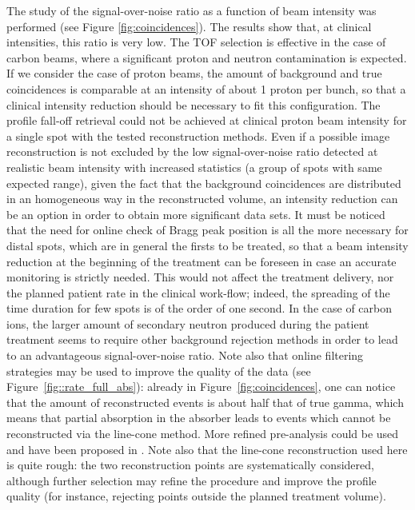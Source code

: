 The study of the signal-over-noise ratio as a function of beam intensity was performed (see Figure \ref{fig:coincidences}). The results show that, at clinical intensities, this ratio is very low. The TOF selection is effective in the case of carbon beams, where a significant proton and neutron contamination is expected. If we consider the case of proton beams, the amount of background and true coincidences is comparable at an intensity of about 1 proton per bunch, so that a clinical intensity reduction should be necessary to fit this configuration. The profile fall-off retrieval could not be achieved at clinical proton beam intensity for a single spot with the tested reconstruction methods. Even if a possible image reconstruction is not excluded by the low signal-over-noise ratio detected at realistic beam intensity with increased statistics (a group of spots with same expected range), given the fact that the background coincidences are distributed in an homogeneous way in the reconstructed volume, an intensity reduction can be an option in order to obtain more significant data sets. It must be noticed that the need for online check of Bragg peak position is all the more necessary for distal spots, which are in general the firsts to be treated, so that a beam intensity reduction at the beginning of the treatment can be foreseen in case an accurate monitoring is strictly needed. This would not affect the treatment delivery, nor the planned patient rate in the clinical work-flow; indeed, the spreading of the time duration for few spots is of the order of one second. 
In the case of carbon ions, the larger amount of secondary neutron produced during the patient treatment seems to require other background rejection methods in order to lead to an advantageous signal-over-noise ratio. Note also that online filtering strategies may be used to improve the quality of the data (see Figure~\ref{fig::rate_full_abs}): already in Figure~\ref{fig:coincidences}, one can notice that the amount of reconstructed events is about half that of true gamma, which means that partial absorption in the absorber leads to events which cannot be reconstructed via the line-cone method. More refined pre-analysis could be used and have been proposed in \cite{Draeger:2017aa}. Note also that the line-cone reconstruction used here is quite rough: the two reconstruction points are systematically considered, although further selection may refine the procedure and improve the profile quality (for instance, rejecting points outside the planned treatment volume).
